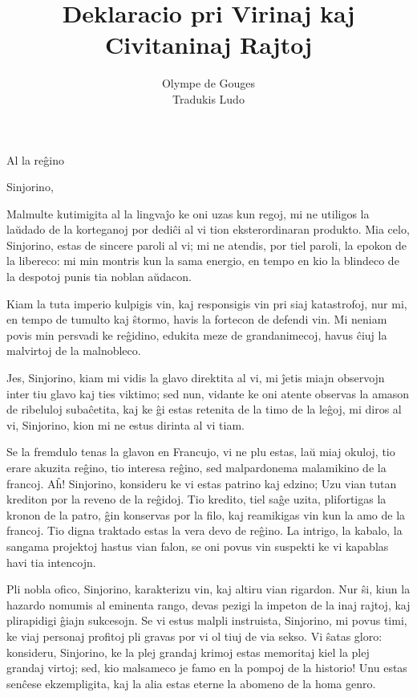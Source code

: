 \documentclass{book}
\title{Deklaracio pri Virinaj kaj Civitaninaj Rajtoj}
\author{Olympe de Gouges\\Tradukis Ludo}
\date{}
\newcommand{\eble}[1]{{\color{blue}#1}}
\begin{document}
\maketitle

\indent Al la reĝino

Sinjorino,

\eble{Malmulte} kutimigita al la lingvaĵo ke oni uzas kun regoj, mi ne utiligos
la laŭdado  de la korteganoj por dediĉi al vi tion eksterordinaran
produkto. Mia celo, Sinjorino, estas de sincere paroli al vi; mi ne
atendis, por tiel paroli, la epokon de la libereco: mi min montris kun la
sama energio, en tempo en kio la blindeco de la despotoj punis tia noblan
aŭdacon.

Kiam la tuta imperio kulpigis vin, kaj \eble{responsigis} vin pri siaj
katastrofoj, nur mi, en tempo de tumulto kaj ŝtormo, havis la fortecon de
defendi vin. Mi neniam povis min persvadi ke reĝidino, edukita meze de
\eble{grandanimecoj}, havus ĉiuj la malvirtoj de la malnobleco.

Jes, Sinjorino, kiam mi vidis la glavo direktita al vi, mi ĵetis miajn
observojn inter tiu glavo kaj ties viktimo; sed nun, vidante ke oni
atente observas la amason de ribeluloj subaĉetita, kaj ke ĝi estas
retenita de la timo de la leĝoj, mi diros al vi, Sinjorino, kion mi ne
estus dirinta al vi tiam.

Se la fremdulo \eble{tenas la glavon} en Francujo, vi ne plu estas, laŭ
miaj okuloj, tio erare akuzita reĝino, tio interesa reĝino, sed
malpardonema malamikino de la francoj. Aĥ! Sinjorino, konsideru ke vi
estas patrino kaj edzino; Uzu vian tutan \eble{krediton} por la reveno de
la reĝidoj. Tio \eble{kredito}, tiel saĝe uzita, plifortigas la kronon de
la patro, ĝin konservas por la filo, kaj reamikigas vin kun la amo de la
francoj. Tio digna traktado estas la vera devo de reĝino. La intrigo,
la kabalo, la sangama projektoj hastus vian falon, se oni povus vin
suspekti ke vi kapablas havi tia intencojn.

Pli nobla ofico, Sinjorino, karakterizu vin, kaj altiru vian rigardon.
Nur ŝi, kiun la hazardo nomumis al eminenta rango, devas pezigi la
impeton de la inaj rajtoj, kaj plirapidigi ĝiajn sukcesojn. Se vi estus
malpli instruista, Sinjorino, mi povus timi, ke viaj personaj profitoj
pli gravas por vi ol tiuj de via sekso. Vi ŝatas gloro: konsideru,
Sinjorino, ke la plej grandaj krimoj estas memoritaj kiel la plej grandaj
virtoj; sed, \eble{kio} malsameco \eble{je} famo en la pompoj de la
historio! Unu estas senĉese \eble{ekzempligita}, kaj la alia estas eterne
la abomeno de la homa genro.
\end{document}
